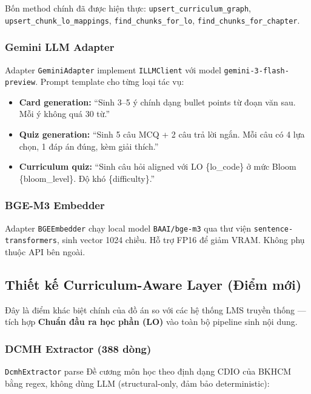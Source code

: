 Bốn method chính đã được hiện thực:
\texttt{upsert\_curriculum\_graph},
\texttt{upsert\_chunk\_lo\_mappings},
\texttt{find\_chunks\_for\_lo},
\texttt{find\_chunks\_for\_chapter}.

\subsubsection{Gemini LLM Adapter}

Adapter \texttt{GeminiAdapter} implement \texttt{ILLMClient} với
model \texttt{gemini-3-flash-preview}. Prompt template cho từng
loại tác vụ:

\begin{itemize}
    \item \textbf{Card generation:} ``Sinh 3--5 ý chính dạng bullet
          points từ đoạn văn sau. Mỗi ý không quá 30 từ.''
    \item \textbf{Quiz generation:} ``Sinh 5 câu MCQ + 2 câu trả
          lời ngắn. Mỗi câu có 4 lựa chọn, 1 đáp án đúng, kèm
          giải thích.''
    \item \textbf{Curriculum quiz:} ``Sinh câu hỏi aligned với LO
          \{lo\_code\} ở mức Bloom \{bloom\_level\}. Độ khó \{difficulty\}.'' 
\end{itemize}

\subsubsection{BGE-M3 Embedder}

Adapter \texttt{BGEEmbedder} chạy local model
\texttt{BAAI/bge-m3} qua thư viện \texttt{sentence-transformers},
sinh vector 1024 chiều. Hỗ trợ FP16 để giảm VRAM. Không phụ
thuộc API bên ngoài.

\subsection{Thiết kế Curriculum-Aware Layer (Điểm mới)}

Đây là điểm khác biệt chính của đồ án so với các hệ thống LMS
truyền thống --- tích hợp \textbf{Chuẩn đầu ra học phần (LO)}
vào toàn bộ pipeline sinh nội dung.

\subsubsection{DCMH Extractor (388 dòng)}

\texttt{DcmhExtractor} parse Đề cương môn học theo định dạng
CDIO của BKHCM bằng regex, không dùng LLM (structural-only,
đảm bảo deterministic):

